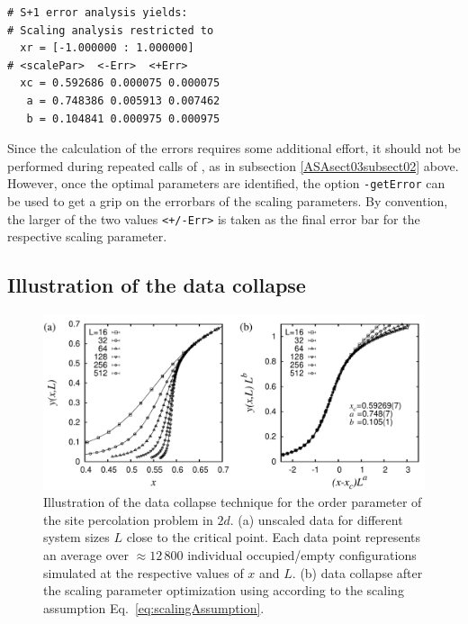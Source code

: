 \begin{lstlisting}
# S+1 error analysis yields:
# Scaling analysis restricted to
  xr = [-1.000000 : 1.000000]
# <scalePar>  <-Err>  <+Err>
  xc = 0.592686 0.000075 0.000075
   a = 0.748386 0.005913 0.007462
   b = 0.104841 0.000975 0.000975
\end{lstlisting}
Since the calculation of the errors requires some additional effort, it should not be 
performed during repeated calls of \myProg{}, as in subsection \ref{ASAsect03subsect02} above. 
However, once the optimal parameters are identified, the option \verb'-getError' can be used 
to get a grip on the errorbars of the scaling parameters.
By convention, the larger of the two values \verb|<+/-Err>| is taken as the final error bar 
for the respective scaling parameter.

\subsection{Illustration of the data collapse}
\label{ASAsect03subsect03}
%
\begin{figure}[t!]
\begin{center}
\includegraphics[width=1.0\linewidth]{./orderParam_doku}
\caption{\footnotesize
Illustration of the data collapse technique for the order parameter of the site percolation 
problem in $2d$.  
(a) unscaled data for different system sizes $L$ close to the critical 
point. Each data point represents an average over $\approx\!12\,800$
individual occupied/empty configurations simulated at the respective values of $x$ and $L$.
(b) data collapse after the scaling parameter optimization using \myProg{} according 
to the scaling assumption Eq.\ \ref{eq:scalingAssumption}.
\label{fig:scalingPlot}}
\end{center}
\end{figure}
